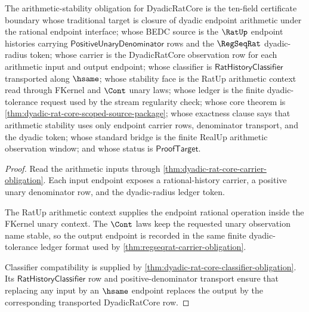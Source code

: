 \begin{theorem}
\label{thm:dyadic-rat-core-arithmetic-stability-obligation}
The arithmetic-stability obligation for DyadicRatCore is the ten-field
certificate boundary whose traditional target is closure of dyadic endpoint
arithmetic under the rational endpoint interface; whose BEDC source is the
$\RatUp$ endpoint histories carrying
$\mathsf{PositiveUnaryDenominator}$ rows and the $\RegSeqRat$
dyadic-radius token; whose carrier is the DyadicRatCore observation row for
each arithmetic input and output endpoint; whose classifier is
$\mathsf{RatHistoryClassifier}$ transported along $\hsame$; whose stability
face is the RatUp arithmetic context read through FKernel and $\Cont$ unary
laws; whose ledger is the finite dyadic-tolerance request used by the stream
regularity check; whose core theorem is
\autoref{thm:dyadic-rat-core-scoped-source-package}; whose exactness clause
says that arithmetic stability uses only endpoint carrier rows, denominator
transport, and the dyadic token; whose standard bridge is the finite RealUp
arithmetic observation window; and whose status is $\mathsf{ProofTarget}$.
\end{theorem}
\begin{proof}
Read the arithmetic inputs through
\autoref{thm:dyadic-rat-core-carrier-obligation}. Each input endpoint exposes
a rational-history carrier, a positive unary denominator row, and the
dyadic-radius ledger token.

The RatUp arithmetic context supplies the endpoint rational operation inside
the FKernel unary context. The $\Cont$ laws keep the requested unary
observation name stable, so the output endpoint is recorded in the same
finite dyadic-tolerance ledger format used by
\autoref{thm:regseqrat-carrier-obligation}.

Classifier compatibility is supplied by
\autoref{thm:dyadic-rat-core-classifier-obligation}. Its
$\mathsf{RatHistoryClassifier}$ row and positive-denominator transport ensure
that replacing any input by an $\hsame$ endpoint replaces the output by the
corresponding transported DyadicRatCore row.
\end{proof}

